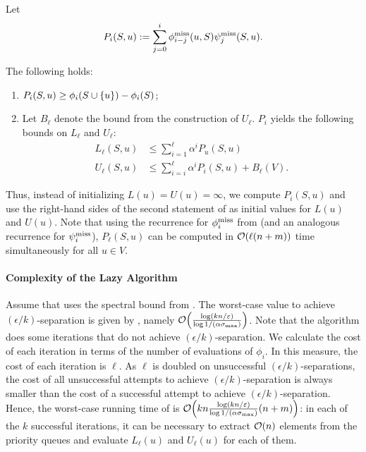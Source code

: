 \begin{lemma}
\label{lemma:ged-walk:lu-bounds}
Let
%
\[
    P_i(S, u) := \sum_{j = 0}^i \phi^{\text{miss}}_{i - j}(u, S)\psi^{\text{miss}}_j(S, u).
\]

The following holds:

\begin{enumerate}
    \item $P_i(S, u) \ge \phi_i(S \cup \set{u}) - \phi_i(S)$;
    \item Let $B_{\ell}$ denote the bound from the construction of $U_{\ell}$.
        $P_i$ yields the following bounds on $L_{\ell}$ and $U_{\ell}$:
    \begin{align*}
        L_{\ell}(S, u) &\le \sum_{i = 1}^{\ell}\alpha^i P_u(S,u)\\
        U_{\ell}(S, u) &\le \sum_{i = i}^{\ell}\alpha^i P_i(S, u) + B_{\ell}(V).
    \end{align*}
\end{enumerate}
\end{lemma}

Thus, instead of initializing $L(u) = U(u) = \infty$, we compute $P_i(S, u)$
and use the right-hand sides of the second statement of 
as initial values for $L(u)$ and $U(u)$.
Note that using the recurrence for $\phi^{\text{miss}}_i$ from 
(and an analogous recurrence for $\psi^{\text{miss}}_i$), $P_{\ell}(S, u)$ can be computed
in $\mathcal{O}(\ell(n + m))$ time simultaneously for all $u \in V$.


\paragraph{Complexity of the Lazy Algorithm}
%
Assume that  uses the spectral bound from
. The worst-case value to achieve
$(\epsilon/k)$-separation is given by ,
namely $\Oh\roundb{\frac{\log(kn/\epsilon)}{\log 1/(\alpha\sigma_{\max})}}$.
Note that the algorithm does some iterations that do not achieve
$(\epsilon/k)$-separation. We calculate the cost of each iteration in terms of
the number of evaluations of $\phi_i$. In this measure, the cost of each
iteration is $\ell$. As $\ell$ is doubled on unsuccessful
$(\epsilon/k)$-separations, the cost of all unsuccessful attempts to achieve
$(\epsilon/k)$-separation is always smaller than the cost of a successful
attempt to achieve $(\epsilon/k)$-separation.
%
Hence, the worst-case running time of  is
$\Oh\roundb{kn\frac{\log(kn/\epsilon)}{\log 1/(\alpha\sigma_{\max})}(n + m)}$:
in each of the $k$ successful iterations, it can be necessary to extract
$\mathcal{O}(n)$ elements from the priority queues and evaluate $L_{\ell}(u)$
and $U_{\ell}(u)$ for each of them.


